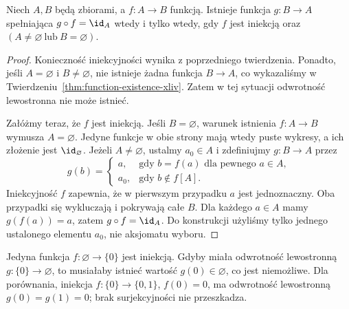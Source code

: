\begin{twierdzenie}
\label{thm:left-inverse-converse-xliv}
Niech $A,B$ będą zbiorami, a $f:A\to B$ funkcją.
Istnieje funkcja $g:B\to A$ spełniająca $g\circ f=\id_A$
wtedy i tylko wtedy, gdy $f$ jest iniekcją oraz
$(A\ne\varnothing\ \text{lub}\ B=\varnothing)$.
\end{twierdzenie}
\begin{proof}
Konieczność iniekcyjności wynika z poprzedniego twierdzenia.
Ponadto, jeśli $A=\varnothing$ i $B\ne\varnothing$, nie istnieje
żadna funkcja $B\to A$, co wykazaliśmy w
Twierdzeniu~\ref{thm:function-existence-xliv}. Zatem w tej sytuacji
odwrotność lewostronna nie może istnieć.

Załóżmy teraz, że $f$ jest iniekcją. Jeśli $B=\varnothing$,
warunek istnienia $f:A\to B$ wymusza $A=\varnothing$.
Jedyne funkcje w obie strony mają wtedy puste wykresy,
a ich złożenie jest $\id_{\varnothing}$.
Jeżeli $A\ne\varnothing$, ustalmy $a_0\in A$ i zdefiniujmy
$g:B\to A$ przez
\[
 g(b)=\begin{cases}
 a,&\text{gdy }b=f(a)\text{ dla pewnego }a\in A,\\
 a_0,&\text{gdy }b\notin f[A].
 \end{cases}
\]
Iniekcyjność $f$ zapewnia, że w pierwszym przypadku
$a$ jest jednoznaczny. Oba przypadki się wykluczają i pokrywają
całe $B$. Dla każdego $a\in A$ mamy $g(f(a))=a$,
zatem $g\circ f=\id_A$. Do konstrukcji użyliśmy tylko jednego
ustalonego elementu $a_0$, nie aksjomatu wyboru.
\end{proof}

\begin{przyklad}
Jedyna funkcja $f:\varnothing\to\{0\}$ jest iniekcją.
Gdyby miała odwrotność lewostronną $g:\{0\}\to\varnothing$,
to musiałaby istnieć wartość $g(0)\in\varnothing$, co jest
niemożliwe. Dla porównania, iniekcja
$f:\{0\}\to\{0,1\}$, $f(0)=0$, ma odwrotność lewostronną
$g(0)=g(1)=0$; brak surjekcyjności nie przeszkadza.
\end{przyklad}

